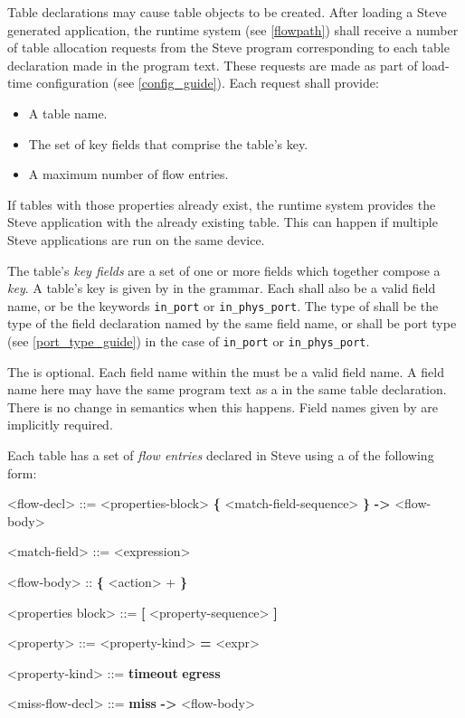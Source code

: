 Table declarations may cause table objects to be created. After loading a Steve generated application, the runtime system (see \ref{flowpath}) shall receive a number of table allocation requests from the Steve program corresponding to each table declaration made in the program text. These requests are made as part of load-time configuration (see \ref{config_guide}). Each request shall provide:

\begin{itemize}
\item A table name.
\item The set of key fields that comprise the table's key.
\item A maximum number of flow entries.
\end{itemize}

If tables with those properties already exist, the runtime system provides the Steve application with the already existing table. This can happen if multiple Steve applications are run on the same device.

The table's \textit{key fields} are a set of one or more fields which together compose a \textit{key}. A table's key is given by  in the grammar. Each  shall also be a valid field name, or be the keywords \texttt{in\_port} or \texttt{in\_phys\_port}. The type of  shall be the type of the field declaration named by the same field name, or shall be port type (see \ref{port_type_guide}) in the case of \texttt{in\_port} or \texttt{in\_phys\_port}.

The  is optional. Each field name within the  must be a valid field name. A field name here may have the same program text as a  in the same table declaration. There is no change in semantics when this happens. Field names given by  are implicitly required.

Each table has a set of \textit{flow entries} declared in Steve using a  of the following form:

\begin{minip}
\begin{grammar}
<flow-decl> ::=
<properties-block>
\textbf{\{} <match-field-sequence> \textbf{\}} \textbf{-\textgreater} <flow-body>

<match-field> ::= <expression>

<flow-body> :: \textbf{\{} <action> + \textbf{\}}

<properties block> ::=
\textbf{[} <property-sequence> \textbf{]}

<property> ::=
<property-kind> \textbf{=} <expr>

<property-kind> ::=
\textbf{timeout}
\alt \textbf{egress}

<miss-flow-decl> ::=
\textbf{miss} \textbf{-\textgreater} <flow-body>
\end{grammar}
\end{minip}

